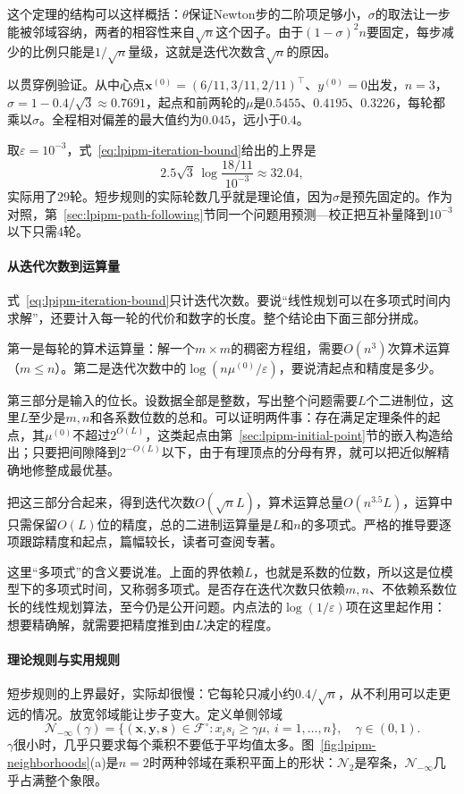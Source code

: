 这个定理的结构可以这样概括：$\theta$保证Newton步的二阶项足够小，$\sigma$的取法让一步能被邻域容纳，两者的相容性来自$\sqrt{n}$这个因子。由于$(1-\sigma)^2n$要固定，每步减少的比例只能是$1/\sqrt{n}$量级，这就是迭代次数含$\sqrt{n}$的原因。

以贯穿例验证。从中心点$\bm{x}^{(0)}=(6/11,3/11,2/11)^\top$、$y^{(0)}=0$出发，$n=3$，$\sigma=1-0.4/\sqrt{3}\approx0.7691$，起点和前两轮的$\mu$是$0.5455$、$0.4195$、$0.3226$，每轮都乘以$\sigma$。全程相对偏差的最大值约为$0.045$，远小于$0.4$。

取$\varepsilon=10^{-3}$，式~\eqref{eq:lpipm-iteration-bound}给出的上界是
\[
 2.5\sqrt{3}\,\log\frac{18/11}{10^{-3}}\approx32.04,
\]
实际用了$29$轮。短步规则的实际轮数几乎就是理论值，因为$\sigma$是预先固定的。作为对照，第~\ref{sec:lpipm-path-following}节同一个问题用预测—校正把互补量降到$10^{-3}$以下只需$4$轮。

\paragraph{从迭代次数到运算量}
式~\eqref{eq:lpipm-iteration-bound}只计迭代次数。要说“线性规划可以在多项式时间内求解”，还要计入每一轮的代价和数字的长度。整个结论由下面三部分拼成。

第一是每轮的算术运算量：解一个$m\times m$的稠密方程组，需要$O(n^3)$次算术运算（$m\leq n$）。第二是迭代次数中的$\log(n\mu^{(0)}/\varepsilon)$，要说清起点和精度是多少。

第三部分是输入的位长。设数据全部是整数，写出整个问题需要$L$个二进制位，这里$L$至少是$m,n$和各系数位数的总和。可以证明两件事：存在满足定理条件的起点，其$\mu^{(0)}$不超过$2^{O(L)}$，这类起点由第~\ref{sec:lpipm-initial-point}节的嵌入构造给出；只要把间隙降到$2^{-O(L)}$以下，由于有理顶点的分母有界，就可以把近似解精确地修整成最优基。

把这三部分合起来，得到迭代次数$O(\sqrt{n}L)$，算术运算总量$O(n^{3.5}L)$，运算中只需保留$O(L)$位的精度，总的二进制运算量是$L$和$n$的多项式。严格的推导要逐项跟踪精度和起点，篇幅较长，读者可查阅专著。

这里“多项式”的含义要说准。上面的界依赖$L$，也就是系数的位数，所以这是位模型下的多项式时间，又称弱多项式。是否存在迭代次数只依赖$m,n$、不依赖系数位长的线性规划算法，至今仍是公开问题。内点法的$\log(1/\varepsilon)$项在这里起作用：想要精确解，就需要把精度推到由$L$决定的程度。

\paragraph{理论规则与实用规则}
短步规则的上界最好，实际却很慢：它每轮只减小约$0.4/\sqrt{n}$，从不利用可以走更远的情况。放宽邻域能让步子变大。定义单侧邻域
\begin{equation}
 \mathcal{N}_{-\infty}(\gamma)=\bigl\{(\bm{x},\bm{y},\bm{s})\in\mathcal{F}^{\circ}:x_is_i\geq\gamma\mu,\ i=1,\ldots,n\bigr\},\quad\gamma\in(0,1).
 \label{eq:lpipm-n-inf}
\end{equation}
$\gamma$很小时，几乎只要求每个乘积不要低于平均值太多。图~\ref{fig:lpipm-neighborhoods}(a)是$n=2$时两种邻域在乘积平面上的形状：$\mathcal{N}_2$是窄条，$\mathcal{N}_{-\infty}$几乎占满整个象限。

